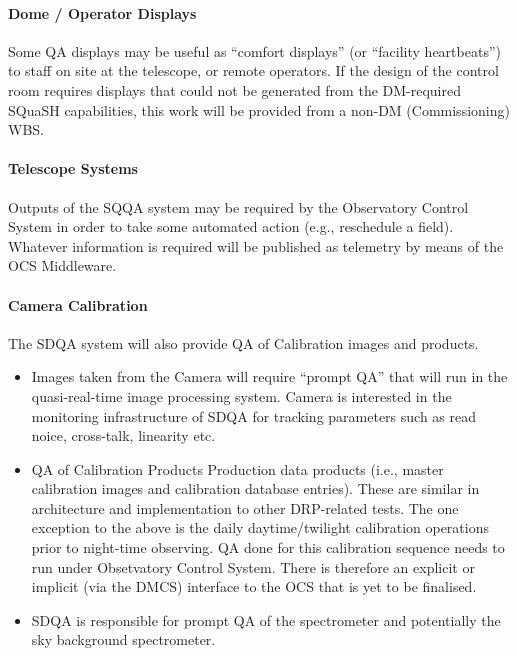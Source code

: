 \paragraph{Dome / Operator Displays}
\label{sec:qaDomeDisplay}

Some QA displays may be useful as ``comfort displays'' (or ``facility heartbeats'') to staff on site at the telescope, or remote operators. If the design of the control room requires displays that could not be generated from the DM-required SQuaSH capabilities, this work will be provided from a non-DM (Commissioning) WBS.

\paragraph{Telescope Systems}
\label{sec:qaTelescopeSystem}

Outputs of the SQQA system may be required by the Observatory Control System in order to take some automated action (e.g., reschedule a field). Whatever information is required will be published as telemetry by means of the OCS Middleware.

\paragraph{Camera Calibration}
\label{sec:qaCameraCalibration}

The SDQA system will also provide QA of Calibration images and products.

\begin{itemize}

\item Images taken from the Camera will require ``prompt QA'' that will run in the quasi-real-time image processing system. Camera is interested in the monitoring infrastructure of SDQA for tracking parameters such as read noice, cross-talk, linearity etc.

\item QA of Calibration Products Production data products (i.e., master calibration images and calibration database entries). These are similar in architecture and implementation to other DRP-related tests. The one exception to the above is the daily daytime/twilight calibration operations prior to night-time observing. QA done for this calibration sequence needs to run under Obsetvatory Control System. There is therefore an explicit or implicit (via the DMCS) interface to the OCS that is yet to be finalised.

\item SDQA is responsible for prompt QA of the spectrometer and potentially the sky background spectrometer.

\end{itemize}

